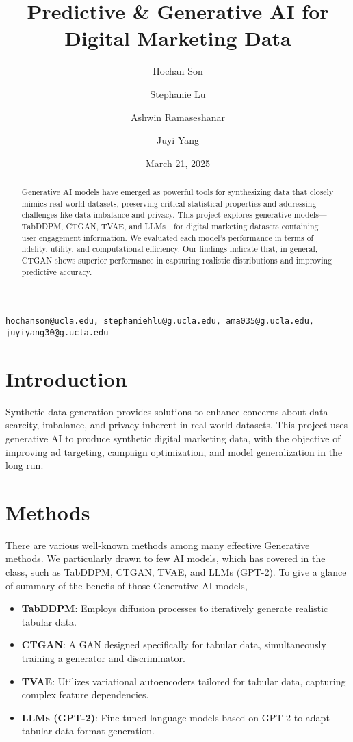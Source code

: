 \documentclass{article}
\title{Predictive \& Generative AI for Digital Marketing Data}
\author[1]{Hochan Son}
\author[1]{Stephanie Lu}
\author[1]{Ashwin Ramaseshanar}
\author[1]{Juyi Yang}
\affil[1]{University of California, Los Angeles}
\date{March 21, 2025}
\begin{document}
\maketitle

\begin{center}
\texttt{hochanson@ucla.edu, stephaniehlu@g.ucla.edu, ama035@g.ucla.edu, juyiyang30@g.ucla.edu}
\end{center}

\begin{abstract}
Generative AI models have emerged as powerful tools for synthesizing data that closely mimics real-world datasets, preserving critical statistical properties and addressing challenges like data imbalance and privacy. This project explores generative models—TabDDPM, CTGAN, TVAE, and LLMs—for digital marketing datasets containing user engagement information. We evaluated each model's performance in terms of fidelity, utility, and computational efficiency. Our findings indicate that, in general, CTGAN shows superior performance in capturing realistic distributions and improving predictive accuracy.
\end{abstract}

\section{Introduction}
Synthetic data generation provides solutions to enhance concerns about data scarcity, imbalance, and privacy inherent in real-world datasets. This project uses generative AI to produce synthetic digital marketing data, with the objective of improving ad targeting, campaign optimization, and model generalization in the long run.

\section{Methods}
There are various well-known methods among many effective Generative methods. We particularly drawn to few AI models, which has covered in the class, such as TabDDPM, CTGAN, TVAE, and LLMs (GPT-2). To give a glance of summary of the benefis of those Generative AI models,
\begin{itemize}
\item \textbf{TabDDPM}: Employs diffusion processes to iteratively generate realistic tabular data.
\item \textbf{CTGAN}: A GAN designed specifically for tabular data, simultaneously training a generator and discriminator.
\item \textbf{TVAE}: Utilizes variational autoencoders tailored for tabular data, capturing complex feature dependencies.
\item \textbf{LLMs (GPT-2)}: Fine-tuned language models based on GPT-2 to adapt tabular data format generation. 
\end{itemize}
\end{document}
